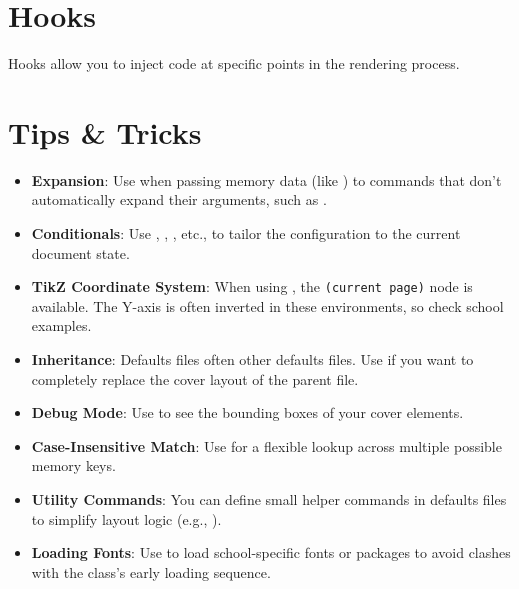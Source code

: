 \section{Hooks}
\label{sec:hooks}

Hooks allow you to inject code at specific points in the rendering process.

\begin{ltx}
\end{ltx}

\section{Tips \& Tricks}
\label{sec:tips}

\begin{itemize}
  \item \textbf{Expansion}: Use  when passing memory data (like ) to commands that don't automatically expand their arguments, such as .
  \item \textbf{Conditionals}: Use \latexinline{\ifphddoc}, \latexinline{\ifmscdoc}, \latexinline{\ifdocfinal}, etc., to tailor the configuration to the current document state.
  \item \textbf{TikZ Coordinate System}: When using \latexinline{[tikz]}, the \texttt{(current page)} node is available. The Y-axis is often inverted in these environments, so check school examples.
  \item \textbf{Inheritance}: Defaults files often \latexinline{} other defaults files. Use \latexinline{\ntresetcovers} if you want to completely replace the cover layout of the parent file.
  \item \textbf{Debug Mode}: Use  to see the bounding boxes of your cover elements.
  \item \textbf{Case-Insensitive Match}: Use \latexinline{\datamatch} for a flexible lookup across multiple possible memory keys.
  \item \textbf{Utility Commands}: You can define small helper commands in defaults files to simplify layout logic (e.g., \latexinline{\printdwithvspace}).
  \item \textbf{Loading Fonts}: Use \latexinline{\AtEndPreamble} to load school-specific fonts or packages to avoid clashes with the class's early loading sequence.
\end{itemize}
